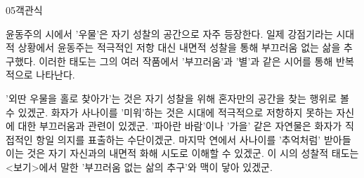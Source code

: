 \documentclass[fs85,seriesWit]{korfarm-base}
\begin{document}
\begin{kfQBlock}{05}{객관식}
\begin{kfEvidence}윤동주의 시에서 '우물'은 자기 성찰의 공간으로 자주 등장한다. 일제 강점기라는 시대적 상황에서 윤동주는 적극적인 저항 대신 내면적 성찰을 통해 부끄러움 없는 삶을 추구했다. 이러한 태도는 그의 여러 작품에서 '부끄러움'과 '별'과 같은 시어를 통해 반복적으로 나타난다.\end{kfEvidence}
\begin{kfChoices}
\kfChoice '외딴 우물을 홀로 찾아가'는 것은 자기 성찰을 위해 혼자만의 공간을 찾는 행위로 볼 수 있겠군.
\kfChoice 화자가 사나이를 '미워'하는 것은 시대에 적극적으로 저항하지 못하는 자신에 대한 부끄러움과 관련이 있겠군.
\kfChoice '파아란 바람'이나 '가을' 같은 자연물은 화자가 직접적인 항일 의지를 표출하는 수단이겠군.
\kfChoice 마지막 연에서 사나이를 '추억처럼' 받아들이는 것은 자기 자신과의 내면적 화해 시도로 이해할 수 있겠군.
\kfChoice 이 시의 성찰적 태도는 <보기>에서 말한 '부끄러움 없는 삶의 추구'와 맥이 닿아 있겠군.
\end{kfChoices}
\end{kfQBlock}

\kfEndMC
\end{document}
